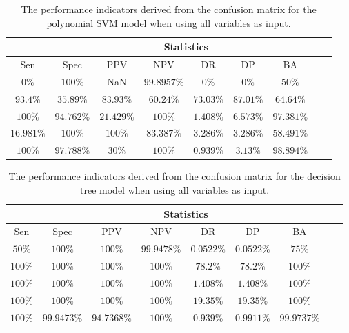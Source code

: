\begin{table}[!ht]
	\centering
	\begin{tabular}{|c|c|c|c|c|c|c|c|c|}
		\hline
		 & \multicolumn{7}{c|}{Statistics} \\ \hline
		Sen & Spec & PPV & NPV & DR & DP & BA \\ \hline
		$0\%$ & $100\%$ & NaN & $99.8957\%$ & $0\%$ & $0\%$ & $50\%$ \\ \hline
		$93.4\%$ & $35.89\%$ & $83.93\%$ & $60.24\%$ & $73.03\%$ & $87.01\%$ & $64.64\%$ \\ \hline
		$100\%$ & $94.762\%$ & $21.429\%$ & $100\%$ & $1.408\%$ & $6.573\%$ & $97.381\%$ \\ \hline
		$16.981\%$ & $100\%$ & $100\%$ & $83.387\%$ & $3.286\%$ & $3.286\%$ & $58.491\%$ \\ \hline
		$100\%$ & $97.788\%$ & $30\%$ & $100\%$ & $0.939\%$ & $3.13\%$ & $98.894\%$ \\ \hline
	\end{tabular}
	\caption{The performance indicators derived from the confusion matrix for the polynomial SVM model when using all variables as input.}
	\label{tab:cs:all:svmPoly}
\end{table}

\begin{table}[!ht]
	\centering
	\begin{tabular}{|c|c|c|c|c|c|c|c|c|}
		\hline
		 & \multicolumn{7}{c|}{Statistics} \\ \hline
		Sen & Spec & PPV & NPV & DR & DP & BA \\ \hline
		$50\%$ & $100\%$ & $100\%$ & $99.9478\%$ & $0.0522\%$ & $0.0522\%$ & $75\%$ \\ \hline
		$100\%$ & $100\%$ & $100\%$ & $100\%$ & $78.2\%$ & $78.2\%$ & $100\%$ \\ \hline
		$100\%$ & $100\%$ & $100\%$ & $100\%$ & $1.408\%$ & $1.408\%$ & $100\%$ \\ \hline
		$100\%$ & $100\%$ & $100\%$ & $100\%$ & $19.35\%$ & $19.35\%$ & $100\%$ \\ \hline
		$100\%$ & $99.9473\%$ & $94.7368\%$ & $100\%$ & $0.939\%$ & $0.9911\%$ & $99.9737\%$ \\ \hline
	\end{tabular}
	\caption{The performance indicators derived from the confusion matrix for the decision tree model when using all variables as input.}
	\label{tab:cs:all:C5.0}
\end{table}

